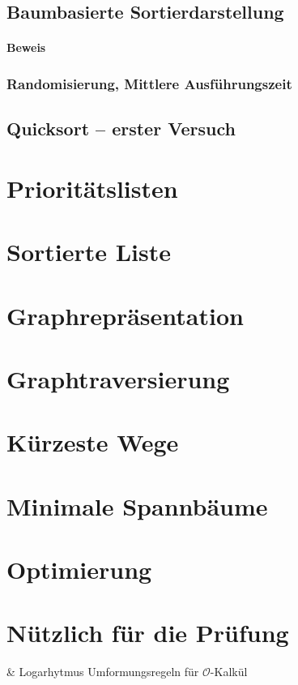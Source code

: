 \documentclass[a4paper]{scrartcl}
\begin{document}
	\subsection{Baumbasierte Sortierdarstellung} 
	\paragraph{Beweis} 
	\subsubsection{Randomisierung, Mittlere Ausführungszeit} 
	\subsection{Quicksort – erster Versuch}

\section[Immer die Übersicht behalten]{Prioritätslisten}
\section[Die eierlegende Wollmilchsau]{Sortierte Liste}
\section[Beziehungen im Griff haben]{Graphrepräsentation}
\section[Globalen Dingen auf der Spur]{Graphtraversierung}
\section[Schnellstens zum Ziel]{Kürzeste Wege}
\section[Immer gut verbunden]{Minimale Spannbäume}
\section[Noch mehr Entwurfsmethoden]{Optimierung}
\section{Nützlich für die Prüfung}
	\begin{easylist}
		& Logarhytmus Umformungsregeln für \(\mathcal{O}\)-Kalkül
	\end{easylist}
\end{document}
